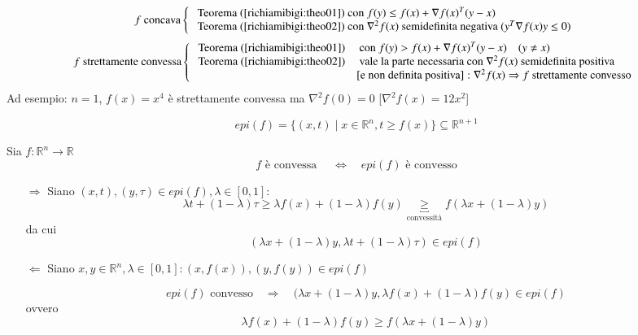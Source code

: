 \begin{observation}
$$f \text{ concava} 
\left\{
\begin{array}{l}
\text{ Teorema } (\ref{richiamibigi:theo01}) \text{ con }
  f(y) \leq f(x) + \nabla f(x)^{T}(y-x) \\
\text{ Teorema } (\ref{richiamibigi:theo02}) \text{ con }
  \nabla^{2}f(x) \text{ semidefinita negativa } (y^{T} \nabla f(x)y \leq 0)
\end{array}
\right.
$$
$$
f \text{ strettamente convessa} 
\left\{
\begin{array}{ll}
\text{ Teorema }   (\ref{richiamibigi:theo01}) & \text{ con }
  f(y) > f(x) + \nabla f(x)^{T}(y-x) \quad (y\neq x) \\
\text{ Teorema }   (\ref{richiamibigi:theo02}) & 
   \text{ vale la parte necessaria con }
  \nabla^{2}f(x) \text{ semidefinita positiva}  \\
 & [\text{e non definita positiva}]: \nabla^{2}f(x) \Rightarrow f \text{ strettamente convesso} 
\end{array}
\right.
$$
Ad esempio: $n=1$, $f(x)=x^{4}$ \`e strettamente convessa ma
$\nabla^{2}f(0) = 0$ [$\nabla^{2}f(x)=12x^2$]
\end{observation}

\begin{defn}[Epigrafico]
$$ epi(f) = \{ (x,t) \; | \; x \in \mathbb{R}^{n}, t \geq f(x) \}
\subseteq \mathbb{R}^{n+1}
$$
\end{defn}

\begin{property}
Sia $f: \mathbb{R}^{n} \rightarrow \mathbb{R}$ 
$$f  \text{ è convessa } \quad   \Longleftrightarrow  
 \quad epi(f)
 \text { è convesso}$$
\end{property}

\begin{thproof}
\begin{itemize}
\item[$\Longrightarrow$]
 Siano $(x,t), (y,\tau) \in epi(f), \lambda \in [0,1]$:
$$
\lambda t + (1-\lambda) \tau \geq \lambda f(x) + 
(1-\lambda) f(y) \underbracket{\geq}_{\text{convessit\`a}}
f(\lambda x + (1-\lambda)y)
$$
da cui
$$ (\lambda x + (1-\lambda) y, 
\lambda t + (1-\lambda) \tau) \in epi(f)
$$
\item[$\Longleftarrow$]
Siano $x,y \in \mathbb{R}^{n}, \lambda \in [0,1]:
 (x,f(x)) ,(y,f(y)) \in epi(f)$

$$ epi(f) \text{ convesso} \quad
\Longrightarrow \quad
(\lambda x + (1-\lambda) y, \lambda f(x) + (1-\lambda) f(y)
 \in epi(f) 
$$
ovvero
$$ \lambda f(x) + (1-\lambda)f(y) \geq f(\lambda x + (1-\lambda)y)$$
\end{itemize}

\end{thproof}




